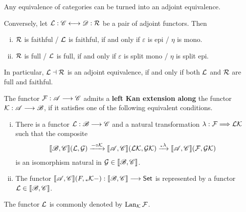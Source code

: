 	\begin{lemma}
		Any equivalence of categories can be turned into an adjoint equivalence.

		Conversely, let $\mathcal{L}: \mathscr{C} <-> \mathscr{D}: \mathcal{R}$ be a pair of adjoint functors. Then
		\begin{enumerate}[(i)]
			\item{
				$\mathcal{R}$ is faithful / $\mathcal{L}$ is faithful, if and only if $\varepsilon$ is epi / $\eta$ is mono.
			}
			\item{
				$\mathcal{R}$ is full / $\mathcal{L}$ is full, if and only if $\varepsilon$ is split mono / $\eta$ is split epi.
			}
		\end{enumerate}
		In particular, $\mathcal{L} \dashv \mathcal{R}$ is an adjoint equivalence, if and only if both $\mathcal{L}$ and $\mathcal{R}$ are full and faithful.
	\end{lemma}

	\begin{definition}
		The functor $\mathcal{F}:\mathscr{A} --> \mathscr{C}$ admits a \textbf{left Kan extension along} the functor $\mathcal{K}:\mathscr{A} --> \mathscr{B}$, if it satisfies one of the following equivalent conditions.
		\begin{enumerate}[(i)]
			\item{
				There is a functor $\mathcal{L}:\mathscr{B}--> \mathscr{C}$ and a natural transformation $\lambda: \mathcal{F} ==> \mathcal{LK}$ such that the composite
				\begin{align*}
					|[\mathscr{B},\mathscr{C}|](\mathcal{L},\mathcal{G}) \xrightarrow{-\circ \mathcal{K}} |[\mathscr{A},\mathscr{C}|](\mathcal{LK},\mathcal{GK}) \xrightarrow{{}_{*}\lambda}|[\mathscr{A},\mathscr{C}|](\mathcal{F},\mathcal{GK})
				\end{align*}
				is an isomorphism natural in $\mathcal{G} \in |[\mathscr{B},\mathscr{C}|]$.

			}
			\item{
				The functor $|[\mathscr{A},\mathscr{C}|](F,{}_{*}\mathcal{K}-):|[\mathscr{B},\mathscr{C}|] --> \textsf{Set}$ is represented by a functor $\mathcal{L} \in |[\mathscr{B},\mathscr{C}|]$.
			}
		\end{enumerate}
		The functor $\mathcal{L}$ is commonly denoted by $\operatorname{Lan}_{\mathcal{K}}\mathcal{F}$.
	\end{definition}

	\begin{lemma}


	\end{lemma}

